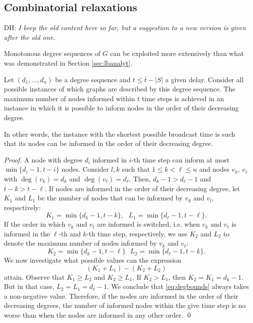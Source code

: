 \subsection{Combinatorial relaxations} \label{sec:lbcombrel}

DH: \emph{I keep the old content here so far, but a suggestion to a new version is given after the old one.}

Monotonous degree sequences of $G$ can be exploited more extensively than what was demonstrated in Section \ref{sec:lbanalyt}. 
\begin{lemma}
\label{lemma:degorder}
Let $(d_1,\dots,d_n)$ be a degree sequence and $t\leq \bar{t}-|S|$ a given delay.
Consider all possible instances of which graphs are described by this degree sequence.
The maximum number of nodes informed within $t$ time steps is achieved in an instance in which it is possible to inform  nodes in the order of their decreasing degree.

In other words, the instance with the shortest possible broadcast time is such that its nodes can be informed in the order of their decreasing degree.

\end{lemma}
\begin{proof}
A node with degree $d_i$ informed in $i$-th time step can inform at most $\min\{d_i-1,t-i\}$ nodes.
Consider $l,k$ such that $1\leq k < \ell\leq n$ and nodes $v_k$, $v_\ell$ with $\deg(v_k)=d_k$ and $\deg(v_\ell)=d_\ell$.
Then, $d_k-1>d_\ell-1$ and $t-k > t-\ell$.
If nodes are informed in the order of their decreasing degree, let $K_1$ and $L_1$ be the number of nodes that can be informed by $v_k$ and $v_l$, respectively:
$$
K_1=\min\{d_k-1,t-k\}, ~~~ L_1=\min\{d_\ell-1,t-\ell\}.
$$
If the order in which $v_k$ and $v_l$ are informed is switched, i.e. when $v_k$ and $v_\ell$ is informed in the $\ell$-th and $k$-th time step, respectively, 
we use $K_2$ and $L_2$ to denote the maximum number of nodes informed by $v_k$ and $v_\ell$:
$$
K_2=\min\{d_k-1,t-\ell\} ~~~ L_2=\min\{d_\ell-1,t-k\}.
$$
We now investigate what possible values can the expression 
\begin{equation}
\label{eq:degbounds}
(K_1+L_1)-(K_2+L_2)
\end{equation}
attain.
Observe that $K_1\geq L_2$ and $K_2\geq L_1$. 
If $K_2>L_1$, then $K_2=K_1=d_k-1$.
But in that case, $L_2=L_1=d_\ell-1$. 
We conclude that \eqref{eq:degbounds} always takes a non-negative value.
Therefore, if the nodes are informed in the order of their decreasing degrees,
the number of informed nodes within the give time step is no worse than when the nodes are informed in any other order.
\qed
\end{proof}

